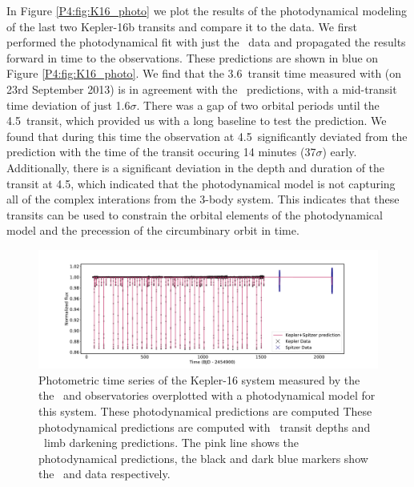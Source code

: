 In Figure \ref{P4:fig:K16_photo} we plot the results of the photodynamical modeling of the last two Kepler-16b transits and compare it to the \spitzer data.
We first performed the photodynamical fit with just the \Kepler~data and propagated the results forward in time to the \spitzer observations. These predictions are shown in blue on Figure \ref{P4:fig:K16_photo}. We find that the 3.6\um~transit time measured with \spitzer (on 23rd September 2013) is in agreement with the \Kepler~predictions, with a mid-transit time deviation of just 1.6$\sigma$. There was a gap of two orbital periods until the 4.5\um~\spitzer transit, which provided us with a long baseline to test the prediction. We found that during this time the observation at 4.5\um~significantly deviated from the prediction with the time of the transit occuring 14 minutes (37$\sigma$) early. Additionally, there is a significant deviation in the depth and duration of the transit at 4.5\um, which indicated that the photodynamical model is not capturing all of the complex interations from the 3-body system. This indicates that these \spitzer transits can be used to constrain the orbital elements of the photodynamical model and the precession of the circumbinary orbit in time.

\begin{figure}
    \centering
    \includegraphics[trim={3cm 0 3cm 0},clip,width=\linewidth]{Kepler16b_photodynamicalmodel.pdf}
    \caption{Photometric time series of the Kepler-16 system measured by the the \Kepler~and \spitzer observatories overplotted with a photodynamical model for this system. These photodynamical predictions are computed These photodynamical predictions are computed with \Kepler~transit depths and \Kepler~limb darkening predictions. The pink line shows the photodynamical predictions, the black and dark blue markers show the \Kepler~and \spitzer data respectively.}
    \label{P4:fig:K16_model}
\end{figure}


